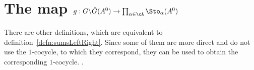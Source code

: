 \begin{comment}
  \begin{cor}
    \marginnote{\cite[Cor.III.2.7]{Loday1994}}
    Write the twisted cocyle $\dot\phi\in\exp_{A^1}(\hat F^k)$ in terms of
    sums of $\hat F^k$ over $\cU^{\leq k}$:
    \[
      \dot \phi_\alpha=S_\alpha^-(\hat F^k)^{-1}S_\alpha^+(\hat F^k)
      \text{, }
      \alpha\in\A^{\leq k} \,.
    \]
    Then, the factors $\dot g^k=(\dot g^k_\alpha)_{\alpha\in\A^{\leq k}}$ and
    $\dot f^k=(\dot f^k_\alpha)_{\alpha\in\A^{\leq k}}$ in the induced
    decompositions satisfy
    \begin{align*}
      \dot g_\alpha^k &=S_\alpha^+(\hat F^{<k})^{-1}
                        S_\alpha^-(\hat F^k)^{-1}
                        S_\alpha^+(\hat F^k)
                        S_\alpha^+(\hat F^{<k}) \,,
    \\\dot f_\alpha^k &=S_\alpha^-(\hat F^{<k})^{-1}
                        S_\alpha^-(\hat F^k)^{-1}
                        S_\alpha^+(\hat F^k)
                        S_\alpha^+(\hat F^{<k}) \,.
    \end{align*}
  \end{cor}
\end{comment}

\section{The map
  $g:G\backslash\hat G(A^0)\to\prod_{\alpha\in\cA}\Sto_\alpha(A^0)$}
  \label{sect:multisummmap}
There are other definitions, which are equivalent to
definition~\ref{defn:sumsLeftRight}. Since some of them are more direct
and do not use the $1$-cocycle, to which they correspond, they can be used to
obtain the corresponding $1$-cocycle.  \cite{Loday2014}.

